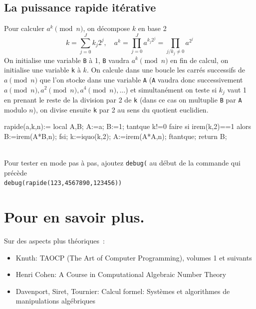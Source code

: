 \documentclass[a4paper,11pt]{book}
\begin{document}
\begin{giacjshere}
\subsection{La puissance rapide it\'erative}
Pour calculer $a^k \pmod n$, on d\'ecompose $k$ en base 2
$$ k=\sum_{j=0}^J k_j 2^j, \quad a^k = \prod_{j=0}^{J} a^{k_j 2^j} 
= \prod_{j/k_j \neq 0} a^{2^j} $$
On initialise une variable \verb|B| \`a 1, \verb|B| vaudra $a^k \pmod
n$ en fin de calcul, on initialise une variable \verb|k| \`a $k$.
On calcule dans une boucle les carr\'es successifs de $a
\pmod n$ que l'on stocke dans une variable \verb|A| (\verb|A| 
vaudra donc successivement $a \pmod n, a^2 \pmod n, a^{4} \pmod n,
...$) et simultan\'ement on teste si $k_j$ vaut 1 en prenant le reste de la
division par 2 de \verb|k| (dans ce cas on multuplie \verb|B| par
\verb|A| modulo $n$), on divise ensuite \verb|k| par 2  au sens du quotient
euclidien.
\begin{giacprog}
rapide(a,k,n):={
  local A,B;
  A:=a; B:=1;
  tantque k!=0 faire
    si irem(k,2)==1 alors B:=irem(A*B,n); fsi;
    k:=iquo(k,2);
    A:=irem(A*A,n);
  ftantque;
  return B;
}
\end{giacprog}
\\
Pour tester en mode pas \`a pas, ajoutez \verb|debug(| au
d\'ebut de la commande qui pr\'ec\`ede\\
\verb|debug(rapide(123,4567890,123456))|

\section{Pour en savoir plus.}
Sur des aspects plus th\'eoriques~:
\begin{itemize}
\item Knuth: TAOCP (The Art of Computer Programming), volumes 1 et suivants
\item Henri Cohen: A Course in Computational Algebraic Number Theory
\item Davenport, Siret, Tournier: Calcul formel: Syst\`emes et algorithmes 
de manipulations  alg\'ebriques
\end{itemize}


\end{giacjshere}
\end{document}
